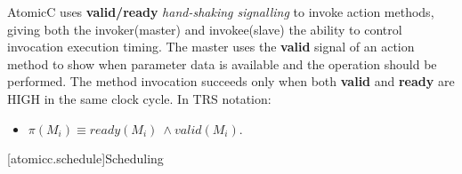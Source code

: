 AtomicC uses \textbf{valid/ready} \textit{hand-shaking signalling}
\cite{Fletcher2009, AXISpec} to invoke action methods,
giving both the invoker(master) and invokee(slave) the ability to control invocation
execution timing.
The master uses the \textbf{valid} signal
of an action method to show when parameter data is available
and the operation should be performed.
The method invocation succeeds only when
both \textbf{valid} and \textbf{ready} are HIGH in the same clock cycle.
\newline
In TRS notation\cite[p.~22]{Hoe:Thesis}:
\begin{itemize}[label= ]
\item $\pi(M_{i}) \equiv ready(M_{i})\ \wedge valid(M_{i})$.
\end{itemize}

[atomicc.schedule]{Scheduling}

